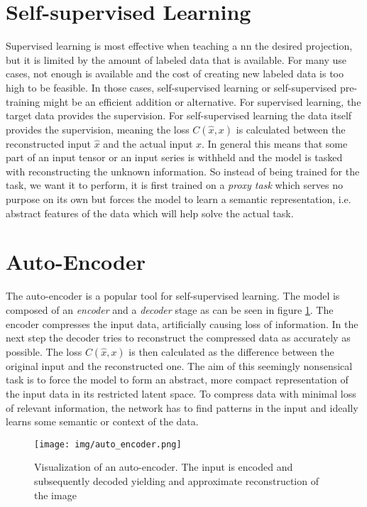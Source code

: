 \section{Self-supervised Learning}

Supervised learning is most effective when teaching a \gls{nn} the desired projection, but it is limited by the amount of labeled data that is available. For many use cases, not enough is available and the cost of creating new labeled data is too high to be feasible. In those cases, self-supervised learning or self-supervised pre-training might be an efficient addition or alternative. For supervised learning, the target data provides the supervision. For self-supervised learning the data itself provides the supervision, meaning the loss $C(\hat{x},x)$ is calculated between the reconstructed input $\hat{x}$ and the actual input $x$. In general this means that some part of an input tensor or an input series is withheld and the model is tasked with reconstructing the unknown information. So instead of being trained for the task, we want it to perform, it is first trained on a \textit{proxy task} which serves no purpose on its own but forces the model to learn a semantic representation, i.e. abstract features of the data which will help solve the actual task.

\section{Auto-Encoder} \label{sec:backgrund:autoencoder}

The auto-encoder is a popular tool for self-supervised learning. The model is composed of an \textit{encoder} and a \textit{decoder} stage as can be seen in figure \ref{fig:auto_encoder}. The encoder compresses the input data, artificially causing loss of information. In the next step the decoder tries to reconstruct the compressed data as accurately as possible. The loss $C(\hat{x},x)$ is then calculated as the difference between the original input and the reconstructed one. The aim of this seemingly nonsensical task is to force the model to form an abstract, more compact representation of the input data in its restricted latent space. To compress data with minimal loss of relevant information, the network has to find patterns in the input and ideally learns some semantic or context of the data. 

\begin{figure}[h]
	\centering
	\texttt{[image: img/auto\_encoder.png]}
	\caption{Visualization of an auto-encoder. The input is encoded and subsequently decoded yielding and approximate reconstruction of the image \cite{auto_encoders}}
	\label{fig:auto_encoder}
\end{figure}

